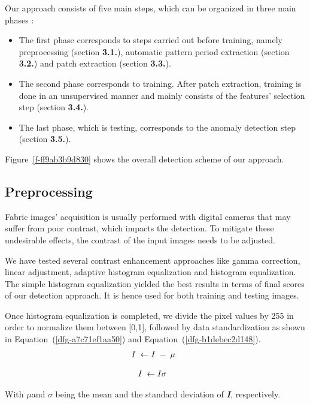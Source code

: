 \documentclass[3p,,preprint,review,12pt]{elsarticle}
\begin{document}
Our approach consists of five main steps, which can be organized in three main phases : 
\begin{itemize}
\item The first phase corresponds to steps carried out before training, namely preprocessing (section \textbf{3.1.}), automatic pattern period extraction (section \textbf{3.2.}) and patch extraction (section \textbf{3.3.}). 
\item The second phase corresponds to training. After patch extraction, training is done in an unsupervised manner and mainly consists of the features' selection step (section \textbf{3.4.}). 
\item The last phase, which is testing, corresponds to the anomaly detection step (section \textbf{3.5.}).
\end{itemize}
Figure~\ref{f-ff9ab3b9d830} shows the overall detection scheme of our approach. 

\subsection{Preprocessing}
Fabric images' acquisition is usually performed with digital cameras that may suffer from poor contrast, which impacts the detection. To mitigate these undesirable effects, the contrast of the input images needs to be adjusted.  

We have tested several contrast enhancement approaches like gamma correction, linear adjustment, adaptive histogram equalization and histogram equalization. The simple histogram equalization yielded the best results in terms of final scores of our detection approach. It is hence used for both training and testing images.

Once histogram equalization is completed, we divide the pixel values by 255 in order to normalize them between [0,1], followed by data standardization as shown in Equation~(\ref{dfg-a7c71ef1aa50}) and Equation~(\ref{dfg-b1debec2d148}). 
\let\saveeqnno\theequation
\let\savefrac\frac
\def\dispfrac{\displaystyle\savefrac}
\begin{eqnarray}
\let\frac\dispfrac
\gdef\theequation{1}
\let\theHequation\theequation
\label{dfg-a7c71ef1aa50}
\begin{array}{@{}l}I\;\leftarrow I\;-\;\mu\end{array}
\end{eqnarray}
\global\let\theequation\saveeqnno
\addtocounter{equation}{-1}\ignorespaces 

\let\saveeqnno\theequation
\let\savefrac\frac
\def\dispfrac{\displaystyle\savefrac}
\begin{eqnarray}
\let\frac\dispfrac
\gdef\theequation{2}
\let\theHequation\theequation
\label{dfg-b1debec2d148}
\begin{array}{@{}l}I\;\leftarrow\frac I\sigma \;\end{array}
\end{eqnarray}
\global\let\theequation\saveeqnno
\addtocounter{equation}{-1}\ignorespaces 
 With \textbf{\textit{\ensuremath{\mu }}}and \textbf{\textit{\ensuremath{\sigma  }}} being the mean and the standard deviation of \textbf{\textit{I}}, respectively. 
\end{document}
